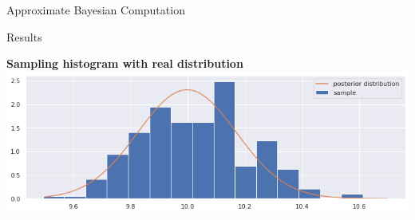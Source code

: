 \documentclass{beamer}
\begin{document}
\begin{section}{Approximate Bayesian Computation}
\begin{frame}{Results}
\begin{center}
	\vspace{0.2cm}
	
	\begin{minipage}{0.63\textwidth}
		\begin{center}
			{\scriptsize \textbf{Sampling histogram with real distribution}}
			\includegraphics[width=\textwidth]{ABC_graphs/ABC_S1}
		\end{center}
	\end{minipage}
\end{center}
\end{frame}


\end{section}
\end{document}
